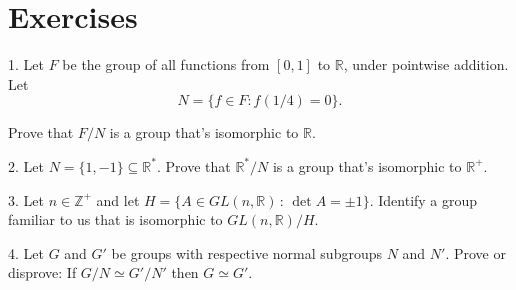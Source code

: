 \documentclass[10pt,openany,oneside]{book}
\theoremstyle{plain}
\theoremstyle{definition}
\theoremstyle{definition}
\theoremstyle{definition}
\theoremstyle{definition}
\numberwithin{equation}{section}
\def\Z{\mathbb{Z}}
\def\R{\mathbb{R}}
\begin{document}
\section[{Exercises}]{Exercises}\label{exercises-10}
\begin{exerciselist}
\item[1.]\hypertarget{exercise-63}{}Let \(F\) be the group of all functions from \([0,1]\) to \(\R\), under pointwise addition. Let%
\begin{equation*}
N=\{f\in F:
f(1/4)=0\}.
\end{equation*}
%
\par
Prove that \(F/N\) is a group that's isomorphic to \(\R\).%
\par\smallskip
\item[2.]\hypertarget{exercise-64}{}Let \(N=\{1,-1\}\subseteq \R^*\). Prove that \(\R^*/N\) is a group that's isomorphic to \(\R^+\).%
\par\smallskip
\item[3.]\hypertarget{exercise-65}{}Let \(n\in \Z^+\) and let \(H=\{A\in GL(n,\R)\,:\, \det A =\pm
1\}\). Identify a group familiar to us that is isomorphic to \(GL(n,\R)/H\).%
\par\smallskip
\item[4.]\hypertarget{exercise-66}{}Let \(G\) and \(G'\) be groups with respective normal subgroups \(N\) and \(N'\). Prove or disprove: If \(G/N\simeq G'/N'\) then \(G\simeq
G'\).%
\par\smallskip
\end{exerciselist}
%
%
%
\appendix
%
\typeout{************************************************}
\typeout{************************************************}
\end{document}
